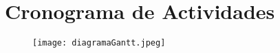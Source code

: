 \section{Cronograma de Actividades}

    \begin{figure}[H]
        \centering
        \texttt{[image: diagramaGantt.jpeg]}
        \label{fig:fig10}
    \end{figure}